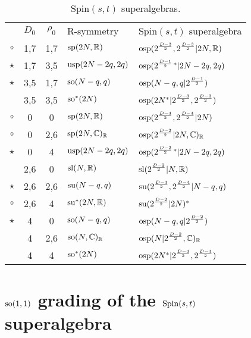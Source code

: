 \documentclass[a4paper,12pt]{article}
\begin{document}
\begin{table}[ht]
\begin{center}
\begin{tabular} {c|c|c|l |l|}

\cline{2-5} &$D_0$&$\rho_0$& R-symmetry&Spin$(s,t)$
superalgebra\\\cline{2-5} $\circ$& 1,7& 1,7& ${\rm
sp}(2N,\mathbb{R})$&${\rm
osp}(2^{\frac{D-3}{2}},2^{\frac{D-3}{2}}|2N,\mathbb{R})$\\\cline{2-5}
$\star$& 1,7& 3,5& ${\rm usp}(2N-2q,2q)$&${\rm
osp}(2^{\frac{D-1}{2}\,*}|2N-2q,2q)$\\\cline{2-5} $\star$& 3,5&
1,7& ${\rm so}(N-q,q)$&${\rm
osp}(N-q,q|2^{\frac{D-1}{2}})$\\\cline{2-5} & 3,5& 3,5& ${\rm
so}^*(2N)$&${\rm
osp}(2{N}^*|2^{\frac{D-3}{2}},2^{\frac{D-3}{2}})$\\\cline{2-5}
\cline{2-5} $\circ$& 0& 0& ${\rm sp}(2N,\mathbb{R})$&${\rm
osp}(2^{\frac{D-4}{2}},2^{\frac{D-4}{2}}|2N)$\\\cline{2-5}
$\circ$& 0& 2,6& ${\rm sp}(2N,\mathbb{C})_{\mathbb{R}}$&${\rm
osp}(2^{\frac{D-2}{2}}|2N,\mathbb{C})_{\mathbb{R}}$\\\cline{2-5} $\star$& 0& 4&
${\rm usp}(2N-2q,2q)$&${\rm
osp}(2^{\frac{D-2}{2}\,*}|2N-2q,2q)$\\\cline{2-5} & 2,6& 0& ${\rm
sl}(N,\mathbb{R})$&${\rm sl}(2^{\frac{D-2}{2}}|N,\mathbb{R})$\\\cline{2-5}
$\star$&2,6& 2,6& ${\rm su}(N-q,q)$&${\rm
su}(2^{\frac{D-4}{2}},2^{\frac{D-4}{2}}|N-q,q)$\\\cline{2-5}
$\circ$& 2,6& 4& ${\rm su}^*(2N,\mathbb{R})$&${\rm
su}(2^{\frac{D-2}{2}}|2N)^*$\\\cline{2-5} $\star$& 4& 0& ${\rm
so}(N-q,q)$&${\rm osp}(N-q,q|2^{\frac{D-2}{2}})$\\\cline{2-5} & 4&
2,6& ${\rm so}(N,\mathbb{C})_{\mathbb{R}}$&${\rm
osp}(N|2^{\frac{D-2}{2}},\mathbb{C})_{\mathbb{R}}$\\\cline{2-5} & 4& 4& ${\rm
so}^*(2N)$&${\rm
osp}(2{N}^*|2^{\frac{D-4}{2}},2^{\frac{D-4}{2}})$\\\cline{2-5}
\end{tabular}
\caption{Spin$(s,t)$ superalgebras.}\label{next}
\end{center}
\end{table}

\section{${\rm so}(1,1)$ grading of the ${\rm Spin}(s,t)$ superalgebra}
\end{document}
